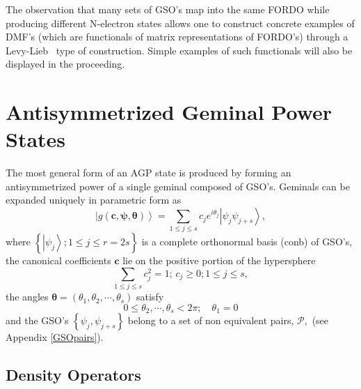 \documentclass[aps,preprint]{revtex4}%
\begin{document}
The observation that many sets of GSO's map into the same FORDO while
producing different N-electron states allows one to construct concrete
examples of DMF's (which are functionals of matrix representations of FORDO's)
through a Levy-Lieb \cite{Levy1979,Lieb1983}\ type of construction. Simple
examples of such functionals will also be displayed in the proceeding.

\section{Antisymmetrized Geminal Power States\label{AGP States}}

The most general form of an AGP state is produced by forming an
antisymmetrized power of a single geminal composed of GSO's. Geminals can be
expanded uniquely in parametric form as
\begin{equation}
\left\vert g\left(  \boldsymbol{c},\boldsymbol{\psi,\theta}\right)
\right\rangle =\sum_{1\leq j\leq s}c_{j}e^{i\theta_{j}}\left\vert \psi_{j}%
\psi_{j+s}\right\rangle ,\label{gem}%
\end{equation}
where $\left\{  \left\vert \psi_{j}\right\rangle ;1\leq j\leq r=2s\right\}  $
is a complete orthonormal basis (conb) of GSO's, the canonical coefficients
$\boldsymbol{c}$ lie on the positive portion of the hypersphere
\begin{equation}
\sum\limits_{1\leq j\leq s}c_{j}^{2}=1;\,c_{j}\geq0;1\leq j\leq s,
\end{equation}
the angles $\boldsymbol{\theta}=\left(  \theta_{1},\theta_{2},\cdots
,\theta_{s}\right)  $ satisfy%
\begin{equation}
0\leq\theta_{2},\cdots,\theta_{s}<2\pi;\quad\theta_{1}=0\label{Phases}%
\end{equation}
and the GSO's $\left\{  \psi_{j},\psi_{j+s}\right\}  $ belong to a set of non
equivalent pairs, $\mathcal{P},$ (see Appendix \ref{GSOpairs}).

\subsection{Density Operators\label{DenOp}}
\end{document}
